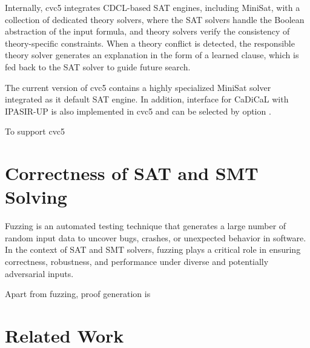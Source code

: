 Internally, cvc5 integrates CDCL-based SAT engines, including  MiniSat, with a collection of dedicated theory solvers, where the SAT solvers handle the Boolean abstraction of the input formula, and theory solvers verify the consistency of theory-specific constraints. When a theory conflict is detected, the responsible theory solver generates an explanation in the form of a learned clause, which is fed back to the SAT solver to guide future search.

The current version of cvc5 contains a highly specialized MiniSat solver integrated as it default SAT engine. In addition, interface for CaDiCaL with IPASIR-UP is also implemented in cvc5 and can be selected by option .

To support cvc5 


\section{Correctness of SAT and SMT Solving}

Fuzzing is an automated testing technique that generates a large number of random input data to uncover bugs, crashes, or unexpected behavior in software. In the context of SAT and SMT solvers, fuzzing plays a critical role in ensuring correctness, robustness, and performance under diverse and potentially adversarial inputs.

Apart from fuzzing, proof generation is 

\section{Related Work}


